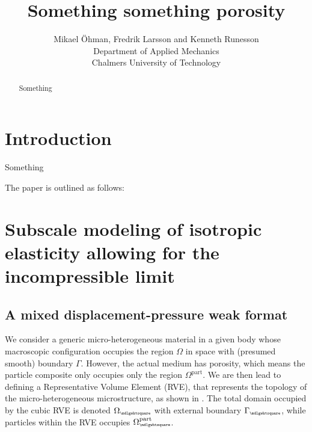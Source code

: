 \documentclass[12pt,a4paper]{article}
\title{Something something porosity}
\author{
Mikael Öhman, Fredrik Larsson and Kenneth Runesson\\
Department of Applied Mechanics \\
Chalmers University of Technology}
\renewcommand{\ta}[1]{\mathbfit{#1}}
\renewcommand{\Box}{\mdlgwhtsquare}
\newcommand{\particle}{\mathrm{part}}
\newcommand{\rve}{
  {\mathchoice
   {\mbox{\scalebox{0.67}{$\Box$}}}
   {\mbox{\scalebox{0.67}{$\Box$}}}
   {\mbox{\scalebox{0.5}{$\Box$}}}
   {\mbox{\scalebox{0.375}{$\Box$}}}
  }
}
\begin{document}
\maketitle
\begin{abstract}
Something
\end{abstract}

\section{Introduction}

Something

The paper is outlined as follows:


\section{Subscale modeling of isotropic elasticity allowing for the incompressible limit}

\subsection{A mixed displacement-pressure weak format}

We consider a generic micro-heterogeneous material in a given body whose macroscopic configuration occupies the region $\Omega$ in space with (presumed smooth) boundary $\Gamma$.
However, the actual medium has porosity, which means the particle composite only occupies only the region $\Omega^\particle$.
We are then lead to defining a Representative Volume Element (RVE), that represents the topology of the micro-heterogeneous microstructure, as shown in .
The total domain occupied by the cubic RVE is denoted $\Omega_\rve$ with external boundary $\Gamma_\rve$, while particles within the RVE occupies $\Omega_\rve^\particle$.
\end{document}
